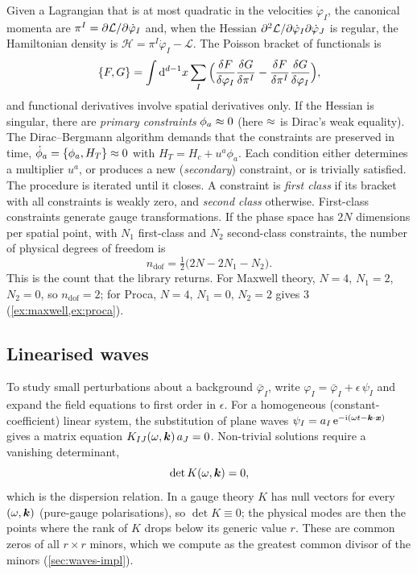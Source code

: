 Given a Lagrangian that is at most quadratic in the velocities $\dot\varphi_I$, the canonical momenta are $\pi^I=\partial\mathcal L/\partial\dot\varphi_I$ and, when the Hessian $\partial^2\mathcal L/\partial\dot\varphi_I\partial\dot\varphi_J$ is regular, the Hamiltonian density is $\mathcal H=\pi^I\dot\varphi_I-\mathcal L$. The Poisson bracket of functionals is
\begin{equation}
\{F,G\}=\int\mathrm{d}^{d-1}x\sum_I\Big(\frac{\delta F}{\delta\varphi_I}\frac{\delta G}{\delta\pi^I}-\frac{\delta F}{\delta\pi^I}\frac{\delta G}{\delta\varphi_I}\Big),
\label{eq:PB}
\end{equation}
and functional derivatives involve spatial derivatives only. If the Hessian is singular, there are \emph{primary constraints} $\phi_a\approx0$ (here $\approx$ is Dirac's weak equality). The Dirac--Bergmann algorithm \cite{Dirac1950,HenneauxTeitelboim} demands that the constraints are preserved in time, $\dot\phi_a=\{\phi_a,H_T\}\approx0$ with $H_T=H_c+u^a\phi_a$. Each condition either determines a multiplier $u^a$, or produces a new (\emph{secondary}) constraint, or is trivially satisfied. The procedure is iterated until it closes. A constraint is \emph{first class} if its bracket with all constraints is weakly zero, and \emph{second class} otherwise. First-class constraints generate gauge transformations. If the phase space has $2N$ dimensions per spatial point, with $N_1$ first-class and $N_2$ second-class constraints, the number of physical degrees of freedom is
\begin{equation}
n_{\mathrm{dof}}=\tfrac12\big(2N-2N_1-N_2\big).
\label{eq:dof}
\end{equation}
This is the count that the library returns. For Maxwell theory, $N=4$, $N_1=2$, $N_2=0$, so $n_{\mathrm{dof}}=2$; for Proca, $N=4$, $N_1=0$, $N_2=2$ gives $3$ (\cref{ex:maxwell,ex:proca}).

\subsection{Linearised waves}
\label{sec:fw-waves}

To study small perturbations about a background $\bar\varphi_I$, write $\varphi_I=\bar\varphi_I+\epsilon\,\psi_I$ and expand the field equations to first order in $\epsilon$. For a homogeneous (constant-coefficient) linear system, the substitution of plane waves $\psi_I=a_I\,\mathrm{e}^{-\mathrm{i}(\omega t-\bm{k}\cdot\bm{x})}$ gives a matrix equation $K_{IJ}(\omega,\bm{k})\,a_J=0$. Non-trivial solutions require a vanishing determinant,
\begin{equation}
\det K(\omega,\bm{k})=0,
\label{eq:disp}
\end{equation}
which is the dispersion relation. In a gauge theory $K$ has null vectors for every $(\omega,\bm{k})$ (pure-gauge polarisations), so $\det K\equiv0$; the physical modes are then the points where the rank of $K$ drops below its generic value $r$. These are common zeros of all $r\times r$ minors, which we compute as the greatest common divisor of the minors (\cref{sec:waves-impl}).

